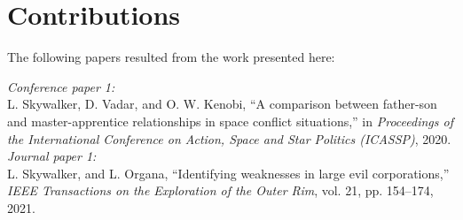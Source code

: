 \section{Contributions}

The following papers resulted from the work presented here: \\

\begin{tcolorbox}[width=\linewidth, colback=white!95!black, boxrule=0.5pt]
	\small
	\textit{Conference paper 1:} \\
	L. Skywalker, D. Vadar, and O. W. Kenobi, ``A comparison between father-son and master-apprentice relationships in space conflict situations,'' in \textit{Proceedings of the International Conference on Action, Space and Star Politics (ICASSP)}, 2020. \\
	
	\textit{Journal paper 1:} \\
	L. Skywalker, and L. Organa, ``Identifying weaknesses in large evil corporations,'' \textit{IEEE Transactions on the Exploration of the Outer Rim}, vol. 21, pp. 154--174, 2021.	
\end{tcolorbox}

